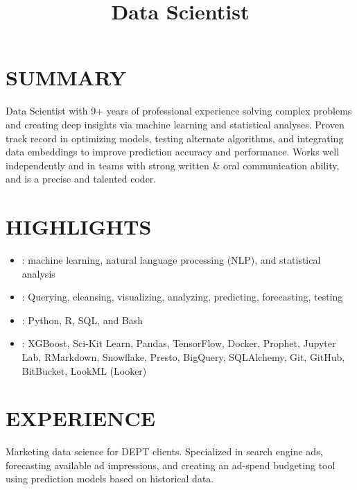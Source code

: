 \documentclass[resmargin, centered, 10pt]{res}
\begin{document}
\address{\href{mailto:kirkwood.donavin@gmail.com}{Kirkwood.Donavin@Gmail.com}}
\address{+1 (801) 554-6834}
\address{}
\address{}

\begin{resume}
	
\fullline

\section{SUMMARY}

Data Scientist with 9+ years of professional experience solving complex problems and creating deep insights via machine learning and statistical analyses. Proven track record in optimizing
models, testing alternate algorithms, and integrating data embeddings to improve prediction accuracy and performance. Works well independently and in teams with strong written \& oral communication ability, and is a precise and talented coder.

\fullline

\section{HIGHLIGHTS}

\begin{itemize}[topsep=0pt]
	\item {}: machine learning, natural language processing (NLP), and statistical analysis
	\item {}: Querying, cleansing, visualizing, analyzing, predicting, forecasting, testing
	\item {}: Python, R, SQL, and Bash
	\item {}: XGBoost, Sci-Kit Learn, Pandas, TensorFlow, Docker, Prophet, Jupyter Lab, RMarkdown, Snowflake, Presto, BigQuery, SQLAlchemy, Git, GitHub, BitBucket, LookML (Looker)
\end{itemize}
\fullline
 
\section{EXPERIENCE}

\title{Data Scientist}
\begin{position}
	Marketing data science for DEPT clients. Specialized in search engine ads, forecasting available ad impressions, and creating an ad-spend budgeting tool using prediction models based on historical data.


\end{position}
\end{resume}
\end{document}
